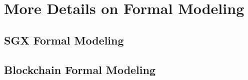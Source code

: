 \section{More Details on Formal Modeling} 
\subsection{SGX Formal Modeling}
\label{sec:sgxmodel}


\subsection{Blockchain Formal Modeling}
\label{sec:blockchainmodel}
